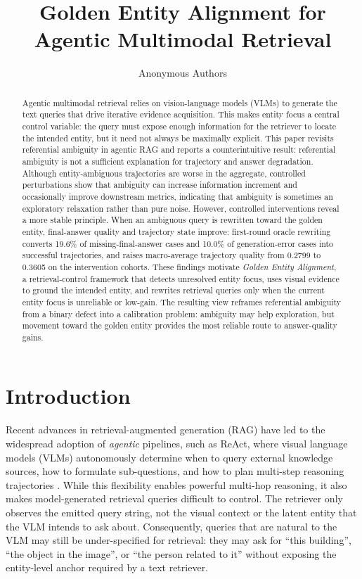 \documentclass{article}
\title{Golden Entity Alignment for Agentic Multimodal Retrieval}
\author{Anonymous Authors}
\begin{document}
\maketitle

\begin{abstract}
Agentic multimodal retrieval relies on vision-language models (VLMs) to generate the text queries that drive iterative evidence acquisition.
This makes entity focus a central control variable: the query must expose enough information for the retriever to locate the intended entity, but it need not always be maximally explicit.
This paper revisits referential ambiguity in agentic RAG and reports a counterintuitive result: referential ambiguity is not a sufficient explanation for trajectory and answer degradation.
Although entity-ambiguous trajectories are worse in the aggregate, controlled perturbations show that ambiguity can increase information increment and occasionally improve downstream metrics, indicating that ambiguity is sometimes an exploratory relaxation rather than pure noise.
However, controlled interventions reveal a more stable principle.
When an ambiguous query is rewritten toward the golden entity, final-answer quality and trajectory state improve: first-round oracle rewriting converts 19.6\% of missing-final-answer cases and 10.0\% of generation-error cases into successful trajectories, and raises macro-average trajectory quality from 0.2799 to 0.3605 on the intervention cohorts.
These findings motivate \emph{Golden Entity Alignment}, a retrieval-control framework that detects unresolved entity focus, uses visual evidence to ground the intended entity, and rewrites retrieval queries only when the current entity focus is unreliable or low-gain.
The resulting view reframes referential ambiguity from a binary defect into a calibration problem: ambiguity may help exploration, but movement toward the golden entity provides the most reliable route to answer-quality gains.
\end{abstract}

\section{Introduction}
Recent advances in retrieval-augmented generation (RAG) have led to the widespread adoption of \emph{agentic} pipelines, such as ReAct, where visual language models (VLMs) autonomously determine when to query external knowledge sources, how to formulate sub-questions, and how to plan multi-step reasoning trajectories \cite{yao2022react,li2024benchmarking}.
While this flexibility enables powerful multi-hop reasoning, it also makes model-generated retrieval queries difficult to control.
The retriever only observes the emitted query string, not the visual context or the latent entity that the VLM intends to ask about.
Consequently, queries that are natural to the VLM may still be under-specified for retrieval: they may ask for ``this building'', ``the object in the image'', or ``the person related to it'' without exposing the entity-level anchor required by a text retriever.
\end{document}
